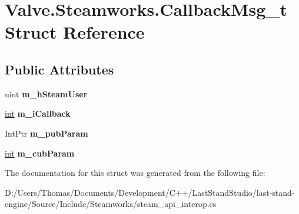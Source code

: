 \hypertarget{structValve_1_1Steamworks_1_1CallbackMsg__t}{}\section{Valve.\+Steamworks.\+Callback\+Msg\+\_\+t Struct Reference}
\label{structValve_1_1Steamworks_1_1CallbackMsg__t}
\subsection*{Public Attributes}
\begin{DoxyCompactItemize}
\item 
\hypertarget{structValve_1_1Steamworks_1_1CallbackMsg__t_adeac0acd5a1649108fab8bb82ffee801}{}uint {\bfseries m\+\_\+h\+Steam\+User}\label{structValve_1_1Steamworks_1_1CallbackMsg__t_adeac0acd5a1649108fab8bb82ffee801}

\item 
\hypertarget{structValve_1_1Steamworks_1_1CallbackMsg__t_a74c373f0ff628ac911472638bc70060b}{}\hyperlink{SDL__thread_8h_a6a64f9be4433e4de6e2f2f548cf3c08e}{int} {\bfseries m\+\_\+i\+Callback}\label{structValve_1_1Steamworks_1_1CallbackMsg__t_a74c373f0ff628ac911472638bc70060b}

\item 
\hypertarget{structValve_1_1Steamworks_1_1CallbackMsg__t_aa800d50a60eadbb8e89a9bd794147d0e}{}Int\+Ptr {\bfseries m\+\_\+pub\+Param}\label{structValve_1_1Steamworks_1_1CallbackMsg__t_aa800d50a60eadbb8e89a9bd794147d0e}

\item 
\hypertarget{structValve_1_1Steamworks_1_1CallbackMsg__t_ad9e9390fe873759af05919a47dc51422}{}\hyperlink{SDL__thread_8h_a6a64f9be4433e4de6e2f2f548cf3c08e}{int} {\bfseries m\+\_\+cub\+Param}\label{structValve_1_1Steamworks_1_1CallbackMsg__t_ad9e9390fe873759af05919a47dc51422}

\end{DoxyCompactItemize}


The documentation for this struct was generated from the following file\+:\begin{DoxyCompactItemize}
\item 
D\+:/\+Users/\+Thomas/\+Documents/\+Development/\+C++/\+Last\+Stand\+Studio/last-\/stand-\/engine/\+Source/\+Include/\+Steamworks/steam\+\_\+api\+\_\+interop.\+cs\end{DoxyCompactItemize}
